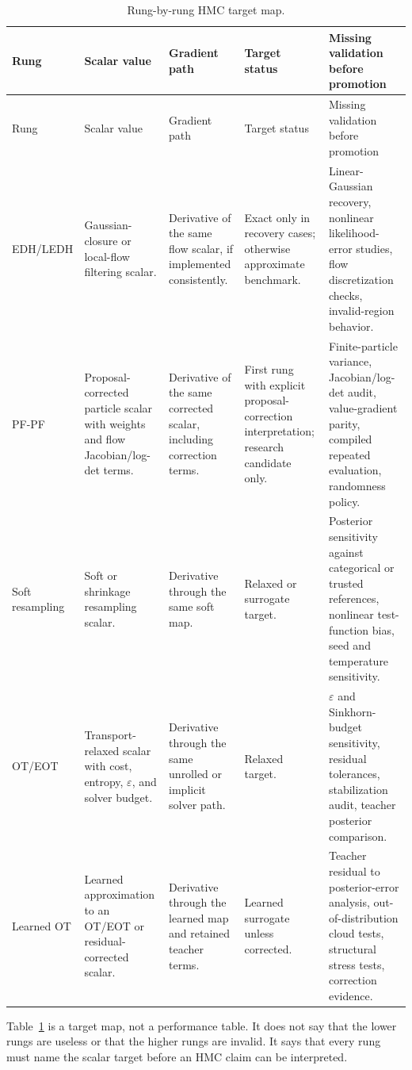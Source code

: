 \begin{longtable}{@{}p{} p{} p{} p{} p{}@{}}
\caption{Rung-by-rung HMC target map.}
\label{tab:bf-dpf-hmc-rungs}\\
\toprule
Rung & Scalar value & Gradient path & Target status & Missing validation before promotion \\
\midrule
\endfirsthead
\toprule
Rung & Scalar value & Gradient path & Target status & Missing validation before promotion \\
\midrule
\endhead
EDH/LEDH &
Gaussian-closure or local-flow filtering scalar. &
Derivative of the same flow scalar, if implemented consistently. &
Exact only in recovery cases; otherwise approximate benchmark. &
Linear-Gaussian recovery, nonlinear likelihood-error studies, flow
discretization checks, invalid-region behavior. \\
PF-PF &
Proposal-corrected particle scalar with weights and flow Jacobian/log-det terms. &
Derivative of the same corrected scalar, including correction terms. &
First rung with explicit proposal-correction interpretation; research
candidate only. &
Finite-particle variance, Jacobian/log-det audit, value-gradient parity,
compiled repeated evaluation, randomness policy. \\
Soft resampling &
Soft or shrinkage resampling scalar. &
Derivative through the same soft map. &
Relaxed or surrogate target. &
Posterior sensitivity against categorical or trusted references, nonlinear
test-function bias, seed and temperature sensitivity. \\
OT/EOT &
Transport-relaxed scalar with cost, entropy, $\varepsilon$, and solver budget. &
Derivative through the same unrolled or implicit solver path. &
Relaxed target. &
$\varepsilon$ and Sinkhorn-budget sensitivity, residual tolerances,
stabilization audit, teacher posterior comparison. \\
Learned OT &
Learned approximation to an OT/EOT or residual-corrected scalar. &
Derivative through the learned map and retained teacher terms. &
Learned surrogate unless corrected. &
Teacher residual to posterior-error analysis, out-of-distribution cloud tests,
structural stress tests, correction evidence. \\
\bottomrule
\end{longtable}

Table~\ref{tab:bf-dpf-hmc-rungs} is a target map, not a performance table.  It
does not say that the lower rungs are useless or that the higher rungs are
invalid.  It says that every rung must name the scalar target before an HMC
claim can be interpreted.

